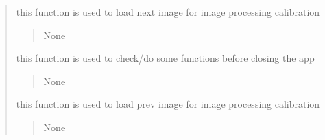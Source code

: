 \documentclass[letterpaper,10pt,english]{sphinxmanual}
\begin{document}
\begin{quote}
\begin{savenotes}
\begin{fulllineitems}

\begin{savenotes}\begin{fulllineitems}
\label{\detokenize{setting/setting_api:oxin.setting_api.API.next_image_precessing}}
\pysigstartsignatures
{}
\pysigstopsignatures
\sphinxAtStartPar
this function is used to load next image for image processing calibration
\begin{quote}\begin{description}
\sphinxAtStartPar
None

\end{description}\end{quote}

\end{fulllineitems}\end{savenotes}


\begin{savenotes}\begin{fulllineitems}
\label{\detokenize{setting/setting_api:oxin.setting_api.API.on_close_operations}}
\pysigstartsignatures
{}
\pysigstopsignatures
\sphinxAtStartPar
this function is used to check/do some functions before closing the app
\begin{quote}\begin{description}
\sphinxAtStartPar
None

\end{description}\end{quote}

\end{fulllineitems}\end{savenotes}


\begin{savenotes}\begin{fulllineitems}
\label{\detokenize{setting/setting_api:oxin.setting_api.API.previous_image_precessing}}
\pysigstartsignatures
{}
\pysigstopsignatures
\sphinxAtStartPar
this function is used to load prev image for image processing calibration
\begin{quote}\begin{description}
\sphinxAtStartPar
None


\end{description}
\end{quote}
\end{fulllineitems}
\end{savenotes}
\end{fulllineitems}
\end{savenotes}
\end{quote}
\end{document}
